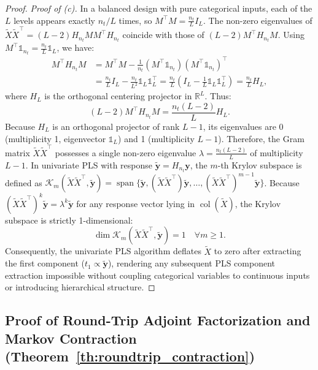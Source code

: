 \documentclass[default,sn-mathphys,Numbered]{sn-jnl}
\theoremstyle{thmstyleone}
\theoremstyle{thmstylethree}
\theoremstyle{thmstyletwo}
\begin{document}
\begin{appendices}
\begin{proof}
\textit{Proof of (c).}
In a balanced design with pure categorical inputs, each of the $L$ levels appears exactly $n_t / L$ times, so $M^\top M = \frac{n_t}{L} I_L$.
The non-zero eigenvalues of $\tilde{X} \tilde{X}^\top = (L - 2) H_{n_t} M M^\top H_{n_t}$ coincide with those of $(L - 2) M^\top H_{n_t} M$.
Using $M^\top \mathds{1}_{n_t} = \frac{n_t}{L} \mathds{1}_L$, we have:
\begin{equation}
\begin{split}
M^\top H_{n_t} M &= M^\top M - \frac{1}{n_t} (M^\top \mathds{1}_{n_t})(M^\top \mathds{1}_{n_t})^\top \\
&= \frac{n_t}{L} I_L - \frac{n_t}{L^2} \mathds{1}_L \mathds{1}_L^\top = \frac{n_t}{L} \left( I_L - \frac{1}{L} \mathds{1}_L \mathds{1}_L^\top \right) = \frac{n_t}{L} H_L,
\end{split}
\end{equation}
where $H_L$ is the orthogonal centering projector in $\mathbb{R}^L$. Thus:
\begin{equation}
(L - 2) M^\top H_{n_t} M = \frac{n_t(L - 2)}{L} H_L.
\end{equation}
Because $H_L$ is an orthogonal projector of rank $L - 1$, its eigenvalues are 0 (multiplicity 1, eigenvector $\mathds{1}_L$) and 1 (multiplicity $L - 1$).
Therefore, the Gram matrix $\tilde{X} \tilde{X}^\top$ possesses a single non-zero eigenvalue $\lambda = \frac{n_t(L - 2)}{L}$ of multiplicity $L - 1$.
In univariate PLS with response $\tilde{\bm{y}} = H_{n_t} \bm{y}$, the $m$-th Krylov subspace is defined as $\mathcal{K}_m(\tilde{X} \tilde{X}^\top, \tilde{\bm{y}}) = \operatorname{span}\{\tilde{\bm{y}}, (\tilde{X}\tilde{X}^\top)\tilde{\bm{y}}, \dots, (\tilde{X}\tilde{X}^\top)^{m-1}\tilde{\bm{y}}\}$.
Because $(\tilde{X} \tilde{X}^\top)^k \tilde{\bm{y}} = \lambda^k \tilde{\bm{y}}$ for any response vector lying in $\operatorname{col}(\tilde{X})$, the Krylov subspace is strictly 1-dimensional:
\begin{equation}
\dim \mathcal{K}_m(\tilde{X}\tilde{X}^\top, \tilde{\bm{y}}) = 1 \quad \forall m \ge 1.
\end{equation}
Consequently, the univariate PLS algorithm deflates $\tilde{X}$ to zero after extracting the first component ($t_1 \propto \tilde{\bm{y}}$), rendering any subsequent PLS component extraction impossible without coupling categorical variables to continuous inputs or introducing hierarchical structure.
\end{proof}


\subsection{Proof of Round-Trip Adjoint Factorization and Markov Contraction (Theorem~\ref{th:roundtrip_contraction})}
\label{subsec:proof_roundtrip}


\end{appendices}
\end{document}
